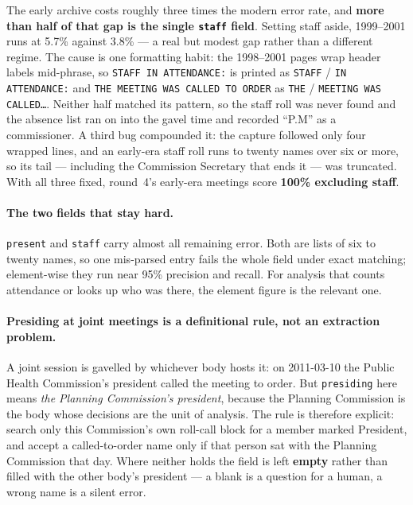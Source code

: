\documentclass[11pt]{article}
\begin{document}
\noindent
The early archive costs roughly three times the modern error rate, and \textbf{more than
half of that gap is the single \texttt{staff} field}. Setting staff aside, 1999--2001 runs
at 5.7\% against 3.8\% --- a real but modest gap rather than a different regime. The cause
is one formatting habit: the 1998--2001 pages wrap header labels mid-phrase, so
\texttt{STAFF IN ATTENDANCE:} is printed as \texttt{STAFF} / \texttt{IN ATTENDANCE:} and
\texttt{THE MEETING WAS CALLED TO ORDER} as \texttt{THE} / \texttt{MEETING WAS CALLED\ldots}.
Neither half matched its pattern, so the staff roll was never found and the absence list ran
on into the gavel time and recorded ``P.M'' as a commissioner. A third bug compounded it:
the capture followed only four wrapped lines, and an early-era staff roll runs to twenty
names over six or more, so its tail --- including the Commission Secretary that ends it ---
was truncated. With all three fixed, round~4's early-era meetings score \textbf{100\%
excluding staff}.

\paragraph{The two fields that stay hard.} \texttt{present} and \texttt{staff} carry almost
all remaining error. Both are lists of six to twenty names, so one mis-parsed entry fails
the whole field under exact matching; element-wise they run near 95\% precision and recall.
For analysis that counts attendance or looks up who was there, the element figure is the
relevant one.

\paragraph{Presiding at joint meetings is a definitional rule, not an extraction problem.}
A joint session is gavelled by whichever body hosts it: on 2011-03-10 the Public Health
Commission's president called the meeting to order. But \texttt{presiding} here means
\emph{the Planning Commission's president}, because the Planning Commission is the body
whose decisions are the unit of analysis. The rule is therefore explicit: search only this
Commission's own roll-call block for a member marked President, and accept a called-to-order
name only if that person sat with the Planning Commission that day. Where neither holds the
field is left \textbf{empty} rather than filled with the other body's president --- a blank
is a question for a human, a wrong name is a silent error.
\end{document}
